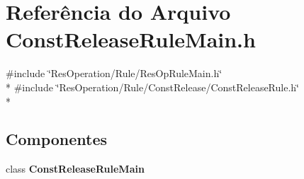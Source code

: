 \section{Referência do Arquivo Const\+Release\+Rule\+Main.\+h}
\label{_rule_2_const_release_2_const_release_rule_main_8h}
{\ttfamily \#include \char`\"{}Res\+Operation/\+Rule/\+Res\+Op\+Rule\+Main.\+h\char`\"{}}\\*
{\ttfamily \#include \char`\"{}Res\+Operation/\+Rule/\+Const\+Release/\+Const\+Release\+Rule.\+h\char`\"{}}\\*
\subsection*{Componentes}
\begin{DoxyCompactItemize}
\item 
class {\bf Const\+Release\+Rule\+Main}
\end{DoxyCompactItemize}
